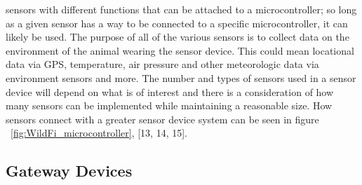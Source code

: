 \documentclass[sigplan,screen,nonacm]{acmart}
\begin{document}
sensors with different functions that can be attached to a microcontroller; so long as a given sensor has a way to be 
connected to a specific microcontroller, it can likely be used. The purpose of all of the various sensors is 
to collect data on the environment of the animal wearing the sensor device. This could mean locational data via GPS,   
temperature, air pressure and other meteorologic data via environment sensors and more. The number and types of sensors 
used in a sensor device will depend on what is of interest and there is a consideration of how many sensors can be 
implemented while maintaining a reasonable size. How sensors connect with a greater sensor device system can 
be seen in figure ~\ref{fig:WildFi_microcontroller}, [13, 14, 15].

\subsection{Gateway Devices}
\label{subsec:Gateway Devices}
\end{document}
